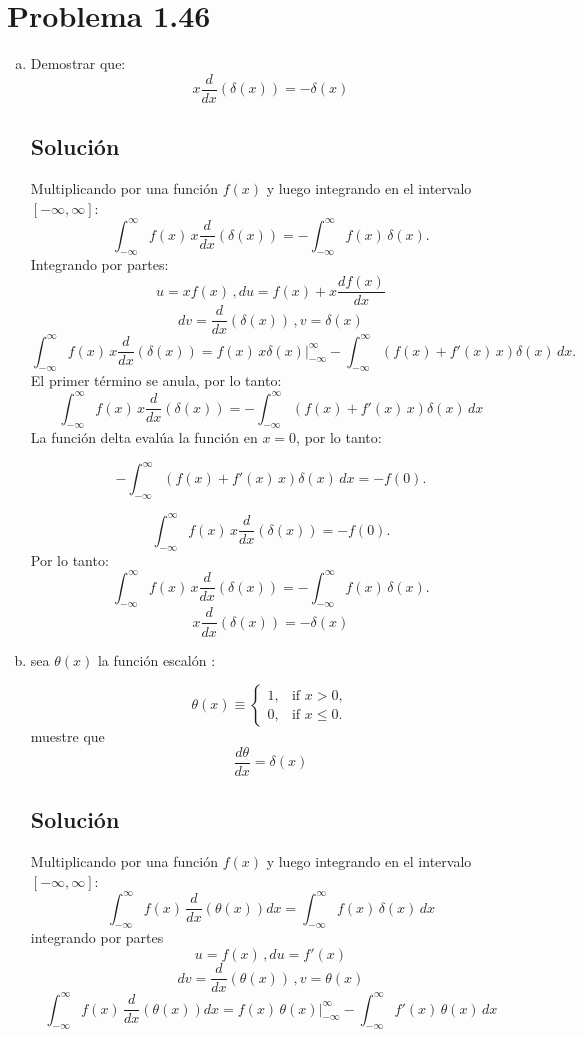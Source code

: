 \documentclass[12pt]{article}
\begin{document}
\section*{\color{blue} Problema 1.46}
\begin{enumerate}[(a)]
    \item Demostrar que:
\[ x \frac{d}{dx}(\delta{(x)})= -\delta{(x)} \]
\subsection*{Solución}
Multiplicando por una función \(f(x)\) y luego integrando en el intervalo \([-\infty,\infty]\):
\[
\int_{-\infty}^{\infty} f(x)\,x \frac{d}{dx}(\delta{(x)}) = -\int_{-\infty}^{\infty} f(x)\,\delta(x).
\]
Integrando por partes:
\[ u = x f(x) \, , du=f(x)+x \frac{df(x)}{dx} \]
\[
 dv = \frac{d}{dx}(\delta(x)) \,, v=\delta(x) \]
\[
\int_{-\infty}^{\infty} f(x)\,x \frac{d}{dx}(\delta{(x)}) =  f(x)\,x \delta(x)|_ {-\infty}^{\infty} - \int_{-\infty}^{\infty} (f(x)+f'(x)\,x) \delta(x) \,dx.
\]
El primer término se anula, por lo tanto:
\[
\int_{-\infty}^{\infty} f(x)\,x \frac{d}{dx}(\delta{(x)}) = -\int_{-\infty}^{\infty} (f(x)+f'(x)\,x )\delta(x) \,dx
\]
La función delta evalúa la función en \(x = 0\), por lo tanto:

\[
-\int_{-\infty}^{\infty} (f(x)+f'(x)\,x) \delta(x) \,dx = -f(0).
\]

\[
\int_{-\infty}^{\infty} f(x)\,x \frac{d}{dx}(\delta{(x)}) = -f(0).
\]
Por lo tanto:
\[
\int_{-\infty}^{\infty} f(x)\,x \frac{d}{dx}(\delta{(x)}) = -\int_{-\infty}^{\infty} f(x)\,\delta(x).
\]
\[\boxed{ x \frac{d}{dx}(\delta{(x)})= -\delta{(x)} }\]

    \item sea \(\theta(x)\) la función escalón :    
 
\[
\theta(x) \equiv
\begin{cases}
1, & \text{if } x > 0,\\
0, & \text{if } x \le 0.
\end{cases}
\]
 muestre que \[\frac{d\theta}{dx} =\delta(x)\]

\subsection*{Solución}
Multiplicando por una función \(f(x)\) y luego integrando en el intervalo \([-\infty,\infty]\):
\[
 \int_{-\infty}^{\infty} f(x) \, \frac{d}{dx}(\theta(x))dx = \int_{-\infty}^{\infty} f(x
) \, \delta(x) \, dx    
\]
integrando por partes 
\[ u = f(x) \, , du=f'(x) \]
\[ dv = \frac{d}{dx}(\theta(x)) \,, v=\theta(x) \]
\[
 \int_{-\infty}^{\infty} f(x) \, \frac{d}{dx}(\theta(x)) dx=  f(x) \, \theta(x)|_
{-\infty}^{\infty} - \int_{-\infty}^{\infty} f'(x) \, \theta(x) \, dx
\]



\end{enumerate}
\end{document}

